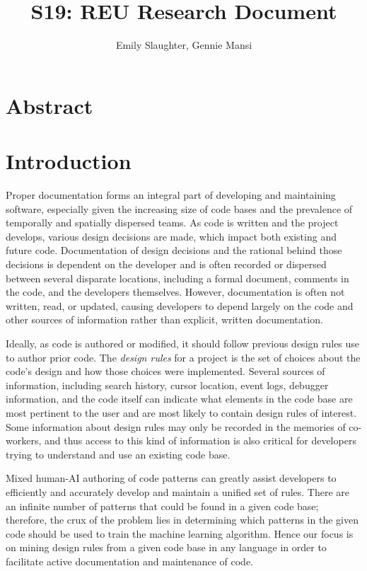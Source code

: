 \documentclass[12pt]{article}
\title{S19: REU Research Document}
\author{Emily Slaughter, Gennie Mansi }
\begin{document}
\maketitle

\clearpage

\tableofcontents

\clearpage

\section{Abstract} \label{abstract}



\clearpage
\section{Introduction} \label{intro}

Proper documentation forms an integral part of developing and maintaining software, especially given the increasing size of code bases and the prevalence of temporally and spatially dispersed teams. As code is written and the project develops, various design decisions are made, which impact both existing and future code. Documentation of design decisions and the rational behind those decisions is dependent on the developer and is often recorded or dispersed between several disparate locations, including a formal document, comments in the code, and the developers themselves. However, documentation is often not written, read, or updated, causing developers to depend largely on the code and other sources of information rather than explicit, written documentation. 

Ideally, as code is authored or modified, it should follow previous design rules use to author prior code.
The \textit{design rules} for a project is the set of choices about the code's design and how those choices were implemented. Several sources of information, including search history, cursor location, event logs, debugger information, and the code itself can indicate what elements in the code base are most pertinent to the user and are most likely to contain design rules of interest. Some information about design rules may only be recorded in the memories of co-workers, and thus access to this kind of information is also critical for developers trying to understand and use an existing code base. 

Mixed human-AI authoring of code patterns can greatly assist developers to efficiently and accurately develop and maintain a unified set of rules. There are an infinite number of patterns that could be found in a given code base; therefore, the crux of the problem lies in determining which patterns in the given code should be used to train the machine learning algorithm. Hence our focus is on mining design rules from a given code base in any language in order to facilitate active documentation and maintenance of code.
\end{document}
